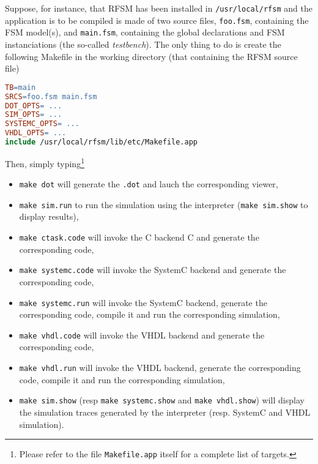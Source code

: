Suppose, for instance, that RFSM has been installed in \verb|/usr/local/rfsm| and the application is
to be compiled is made of two source files, \verb|foo.fsm|, containing the FSM model(s), and
\verb|main.fsm|, containing the global declarations and FSM instanciations (the so-called
\emph{testbench}). The only thing to do is create the following Makefile in the working directory
(that containing the RFSM source file)

\begin{lstlisting}[language=make,frame=single]
TB=main
SRCS=foo.fsm main.fsm
DOT_OPTS= ...
SIM_OPTS= ...
SYSTEMC_OPTS= ...
VHDL_OPTS= ...
include /usr/local/rfsm/lib/etc/Makefile.app
\end{lstlisting}

Then, simply typing\footnote{Please refer to the file \texttt{Makefile.app} itself for
  a complete list of targets.}
  \begin{itemize}
  \item \verb|make dot| will generate the \verb|.dot| and lauch the corresponding viewer,
  \item \verb|make sim.run| to run the simulation using the interpreter (\verb|make sim.show| to display results),
  \item \verb|make ctask.code| will invoke the C backend C and generate the corresponding code,
  \item \verb|make systemc.code| will invoke the SystemC backend  and generate the corresponding code,
  \item \verb|make systemc.run| will invoke the SystemC backend, generate the corresponding
    code, compile it and run the corresponding simulation,
  \item \verb|make vhdl.code| will invoke the VHDL backend  and generate the corresponding code,
  \item \verb|make vhdl.run| will invoke the VHDL backend, generate the corresponding
    code, compile it and run the corresponding simulation,
  \item \verb|make sim.show| (resp \verb|make systemc.show| and \verb|make vhdl.show|) will display
    the simulation traces generated by the interpreter (resp. SystemC and VHDL simulation).
  \end{itemize}


